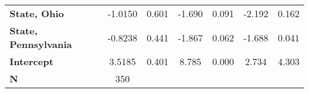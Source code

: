 {\begin{tabular}{lcccccc}
    \textbf{State, Ohio}                            & -1.0150       & 0.601            & -1.690     & 0.091               & -2.192          & 0.162           \\
    \textbf{State, Pennsylvania}                    & -0.8238       & 0.441            & -1.867     & 0.062               & -1.688          & 0.041           \\
    \textbf{Intercept}                              & 3.5185        & 0.401            & 8.785      & 0.000               & 2.734           & 4.303           \\
    \midrule
    \textbf{N}                                      & 350           &                  &            &                     &                 &                 \\
    \bottomrule
\end{tabular}
}
